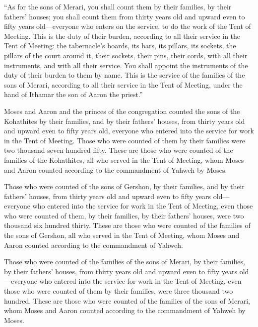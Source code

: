  ``As for the sons of Merari, you shall count them by their
families, by their fathers' houses;  you shall count them
from thirty years old and upward even to fifty years old---everyone who
enters on the service, to do the work of the Tent of Meeting.
 This is the duty of their burden, according to all their
service in the Tent of Meeting: the tabernacle's boards, its bars, its
pillars, its sockets,  the pillars of the court around it,
their sockets, their pins, their cords, with all their instruments, and
with all their service. You shall appoint the instruments of the duty of
their burden to them by name.  This is the service of the
families of the sons of Merari, according to all their service in the
Tent of Meeting, under the hand of Ithamar the son of Aaron the
priest.''

 Moses and Aaron and the princes of the congregation
counted the sons of the Kohathites by their families, and by their
fathers' houses,  from thirty years old and upward even to
fifty years old, everyone who entered into the service for work in the
Tent of Meeting.  Those who were counted of them by their
families were two thousand seven hundred fifty.  These are
those who were counted of the families of the Kohathites, all who served
in the Tent of Meeting, whom Moses and Aaron counted according to the
commandment of Yahweh by Moses.

 Those who were counted of the sons of Gershon, by their
families, and by their fathers' houses,  from thirty years
old and upward even to fifty years old---everyone who entered into the
service for work in the Tent of Meeting,  even those who
were counted of them, by their families, by their fathers' houses, were
two thousand six hundred thirty.  These are those who were
counted of the families of the sons of Gershon, all who served in the
Tent of Meeting, whom Moses and Aaron counted according to the
commandment of Yahweh.

 Those who were counted of the families of the sons of
Merari, by their families, by their fathers' houses,  from
thirty years old and upward even to fifty years old---everyone who
entered into the service for work in the Tent of Meeting, 
even those who were counted of them by their families, were three
thousand two hundred.  These are those who were counted of
the families of the sons of Merari, whom Moses and Aaron counted
according to the commandment of Yahweh by Moses.

